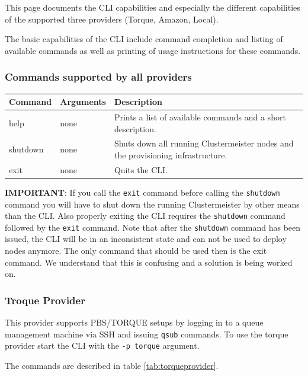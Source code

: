 \documentclass{article}
\begin{document}
This page documents the CLI capabilities and especially the different capabilities of the supported three providers (Torque, Amazon, Local).

The basic capabilities of the CLI include command completion and listing of available commands as well as printing of usage instructions for these commands.

\subsubsection{Commands supported by all providers}


\begin{table}[h]
\centering
\begin{tabular}{|l|l| p{7cm}|}
\hline
\textbf{Command} & \textbf{Arguments} & \textbf{Description} \\ \hline
help & none & Prints a list of available commands and a short description. \\ \hline
shutdown & none & Shuts down all running Clustermeister nodes and the provisioning infrastructure. \\ \hline
exit & none & Quits the CLI. \\ \hline
\end{tabular}
\end{table}

\textbf{IMPORTANT}: If you call the \texttt{exit} command before calling the \texttt{shutdown} command you will have to shut down the running Clustermeister by other means than the CLI. Also properly exiting the CLI requires the \texttt{shutdown} command followed by the \texttt{exit} command. Note that after the \texttt{shutdown} command has been issued, the CLI will be in an inconsistent state and can not be used to deploy nodes anymore. The only command that should be used then is the exit command. We understand that this is confusing and a solution is being worked on.


\subsubsection{Troque Provider}

This provider supports PBS/TORQUE setups by logging in to a queue management machine via SSH and issuing \texttt{qsub} commands. To use the torque provider start the CLI with the \texttt{-p torque} argument.

The commands are described in table \ref{tab:torqueprovider}.
\end{document}
